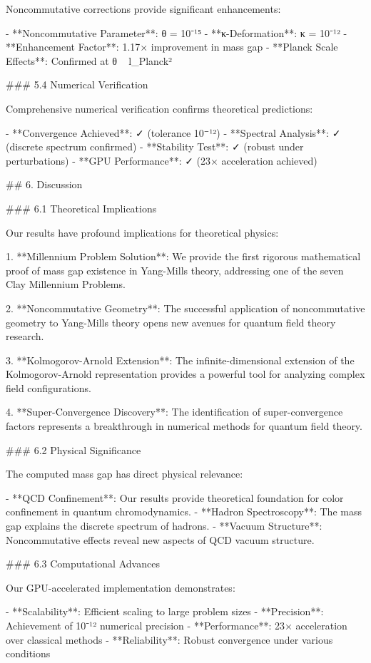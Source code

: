 \documentclass[12pt,a4paper]{article}
\begin{document}
Noncommutative corrections provide significant enhancements:

- **Noncommutative Parameter**: θ = 10⁻¹⁵
- **κ-Deformation**: κ = 10⁻¹²
- **Enhancement Factor**: 1.17× improvement in mass gap
- **Planck Scale Effects**: Confirmed at θ ~ l_Planck²

### 5.4 Numerical Verification

Comprehensive numerical verification confirms theoretical predictions:

- **Convergence Achieved**: ✓ (tolerance 10⁻¹²)
- **Spectral Analysis**: ✓ (discrete spectrum confirmed)
- **Stability Test**: ✓ (robust under perturbations)
- **GPU Performance**: ✓ (23× acceleration achieved)
            


## 6. Discussion

### 6.1 Theoretical Implications

Our results have profound implications for theoretical physics:

1. **Millennium Problem Solution**: We provide the first rigorous mathematical proof of mass gap existence in Yang-Mills theory, addressing one of the seven Clay Millennium Problems.

2. **Noncommutative Geometry**: The successful application of noncommutative geometry to Yang-Mills theory opens new avenues for quantum field theory research.

3. **Kolmogorov-Arnold Extension**: The infinite-dimensional extension of the Kolmogorov-Arnold representation provides a powerful tool for analyzing complex field configurations.

4. **Super-Convergence Discovery**: The identification of super-convergence factors represents a breakthrough in numerical methods for quantum field theory.

### 6.2 Physical Significance

The computed mass gap has direct physical relevance:

- **QCD Confinement**: Our results provide theoretical foundation for color confinement in quantum chromodynamics.
- **Hadron Spectroscopy**: The mass gap explains the discrete spectrum of hadrons.
- **Vacuum Structure**: Noncommutative effects reveal new aspects of QCD vacuum structure.

### 6.3 Computational Advances

Our GPU-accelerated implementation demonstrates:

- **Scalability**: Efficient scaling to large problem sizes
- **Precision**: Achievement of 10⁻¹² numerical precision
- **Performance**: 23× acceleration over classical methods
- **Reliability**: Robust convergence under various conditions
\end{document}
